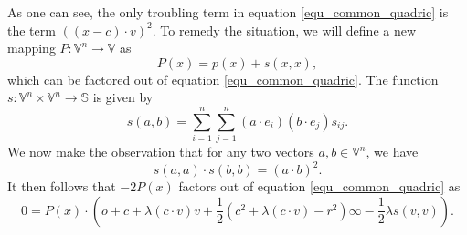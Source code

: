 \documentclass{birkjour}
\theoremstyle{definition}
\theoremstyle{remark}
\numberwithin{equation}{section}
\newcommand{\V}{\mathbb{V}}
\newcommand{\VS}{\mathbb{S}}
\newcommand{\nvao}{o}
\newcommand{\nvai}{\infty}
\begin{document}
As one can see, the only troubling term in equation \eqref{equ_common_quadric} is the
term $((x-c)\cdot v)^2$.  To remedy the situation, we will define a new mapping
$P:\V^n\to\V$ as
\begin{equation}
P(x) = p(x)+s(x,x),
\end{equation}
which can be factored out of equation \eqref{equ_common_quadric}.  The
function $s:\V^n\times\V^n\to\VS$ is given by
\begin{equation}
s(a,b) = \sum_{i=1}^n\sum_{j=1}^n(a\cdot e_i)(b\cdot e_j)s_{ij}.
\end{equation}
We now make the observation that for any two vectors $a,b\in\V^n$, we have
\begin{equation}
s(a,a)\cdot s(b,b) = (a\cdot b)^2.
\end{equation}
It then follows that $-2P(x)$ factors out of equation \eqref{equ_common_quadric} as
\begin{equation}
0 = P(x)\cdot\left(\nvao+c+\lambda(c\cdot v)v+\frac{1}{2}(c^2+\lambda(c\cdot v)-r^2)\nvai-
\frac{1}{2}\lambda s(v,v)\right).
\end{equation}



\end{document}
